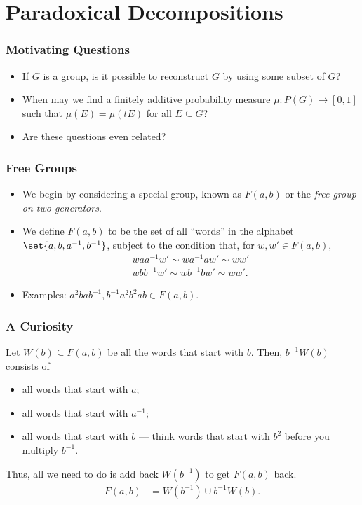 \documentclass{beamer-custom}
\begin{document}
\section{Paradoxical Decompositions}%
\begin{frame}
  \frametitle{Motivating Questions}
  \begin{itemize}
    \item If $G$ is a group, is it possible to reconstruct $G$ by using some subset of $G$?\pause
    \item When may we find a finitely additive probability measure $\mu\colon P(G)\rightarrow [0,1]$ such that $\mu\left( E \right) = \mu\left( tE \right)$ for all $E\subseteq G$?\pause
    \item Are these questions even related?
  \end{itemize}
\end{frame}
\begin{frame}
  \frametitle{Free Groups}
  \begin{itemize}
    \item We begin by considering a special group, known as $F(a,b)$ or the \textit{free group on two generators}.\pause
    \item We define $F(a,b)$ to be the set of all ``words'' in the alphabet $\set{a,b,a^{-1},b^{-1}}$, subject to the condition that, for $w,w'\in F(a,b)$,
      \begin{align*}
        waa^{-1}w' \sim wa^{-1}aw' \sim ww'\\
        wbb^{-1}w' \sim wb^{-1}bw' \sim ww'.
      \end{align*}
    \item Examples: $a^2bab^{-1},b^{-1}a^2b^2ab\in F(a,b)$.
  \end{itemize}
\end{frame}
\begin{frame}
  \frametitle{A Curiosity}
  Let $W(b)\subseteq F(a,b)$ be all the words that start with $b$. Then, $b^{-1}W(b)$ consists of \pause
  \begin{itemize}
    \item all words that start with $a$;\pause
    \item all words that start with $a^{-1}$;\pause
    \item all words that start with $b$ --- think words that start with $b^2$ before you multiply $b^{-1}$.\pause
  \end{itemize}
  Thus, all we need to do is add back $W\left( b^{-1} \right)$ to get $F(a,b)$ back.
  \begin{align*}
    F(a,b) &= W\left( b^{-1} \right)\cup b^{-1}W(b).
  \end{align*}
\end{frame}
\end{document}
